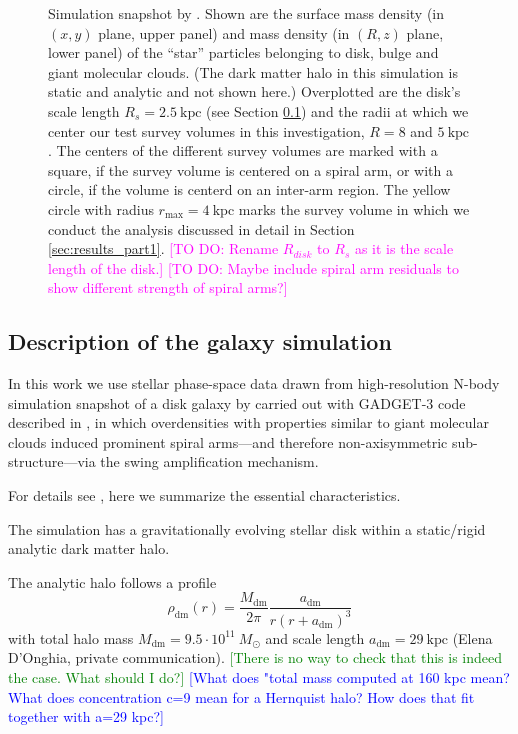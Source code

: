 \documentclass[iop,revtex4,numberedappendix,appendixfloats]{emulateapj}
\newcommand{\Wilma}[1]{\textcolor{Magenta}{#1}}
\newcommand{\HW}[1]{\textcolor{Green}{#1}}
\newcommand{\Jo}[1]{\textcolor{Blue}{#1}}
\begin{document}
\begin{figure}[!htbp]
\caption{Simulation snapshot by \citet{2013ApJ...766...34D} . Shown are the surface mass density (in $(x,y)$ plane, upper panel) and mass density (in $(R,z)$ plane, lower panel) of the ``star'' particles belonging to disk, bulge and giant molecular clouds. (The dark matter halo in this simulation is static and analytic and not shown here.) Overplotted are the disk's scale length $R_s=2.5~\text{kpc}$ (see Section \ref{sec:simulation_description}) and the radii at which we center our test survey volumes in this investigation, $R=8$ and $5~\text{kpc}$. The centers of the different survey volumes are marked with a square, if the survey volume is centered on a spiral arm, or with a circle, if the volume is centerd on an inter-arm region. The yellow circle with radius $r_\text{max}=4~\text{kpc}$ marks the survey volume in which we conduct the analysis discussed in detail in Section \ref{sec:results_part1}. \Wilma{[TO DO: Rename $R_{disk}$ to $R_s$ as it is the scale length of the disk.]} \Wilma{[TO DO: Maybe include spiral arm residuals to show different strength of spiral arms?]}}
\label{fig:simulation}
\end{figure}

\subsection{Description of the galaxy simulation} \label{sec:simulation_description}

In this work we use stellar phase-space data drawn from high-resolution N-body simulation snapshot of a disk galaxy by \citet{2013ApJ...766...34D} carried out with GADGET-3 code described in \citet{2005MNRAS.361..776S}, in which overdensities with properties similar to giant molecular clouds induced prominent spiral arms---and therefore non-axisymmetric sub-structure---via the swing amplification mechanism. 

For details see \citet{2013ApJ...766...34D}, here we summarize the essential characteristics.

The simulation has a gravitationally evolving stellar disk within a static/rigid analytic dark matter halo.

The analytic halo follows a \citet{1990ApJ...356..359H} profile
\begin{equation}
\rho_\text{dm}(r) = \frac{M_\text{dm}}{2\pi} \frac{a_\text{dm}}{r (r+a_\text{dm})^3} \label{eq:dm_hernquist}
\end{equation}
with total halo mass $M_\text{dm} = 9.5\cdot 10^{11} ~M_\odot$ and scale length $a_\text{dm} = 29~\text{kpc}$ (Elena D'Onghia, private communication). \HW{[There is no way to check that this is indeed the case. What should I do?]} \Jo{[What does "total mass computed at 160 kpc mean? What does concentration c=9 mean for a Hernquist halo? How does that fit together with a=29 kpc?]}
\end{document}
